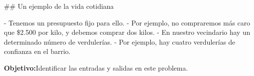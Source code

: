 ## Un ejemplo de la vida cotidiana


- Tenemos un presupuesto fijo para ello.
    - Por ejemplo, no compraremos más caro que \$2.500 por kilo, y debemos comprar dos kilos.
- En nuestro vecindario hay un determinado número de verdulerías.
    - Por ejemplo, hay cuatro verdulerías de confianza en el barrio.

\pause

\bgnblocknormal[wd=.9\textwidth,centered=true]
\textbf{Objetivo:}\newline Identificar las entradas y salidas en este problema.
\trmblocknormal
